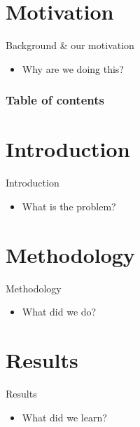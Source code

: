 \documentclass[10pt]{beamer}
\title[\presentationtitleshort]{\presentationtitle}
\author{\presentingauthor}
\institute[\instituteabbrv]{\institutename}
\date{\presentationdate}
\let\olditem\item
\renewcommand{\item}{\setlength{\itemsep}{\fill}\olditem}
\begin{document}
\frame{\titlepage}

\section{Motivation}

	\begin{frame}{Background \& our motivation}
	\begin{itemize}
		\item Why are we doing this? \cite{example}
	\end{itemize}
	\end{frame}

	\begin{frame}
		\frametitle{Table of contents}
		\tableofcontents
	\end{frame}

\section{Introduction}

	\begin{frame}{Introduction}
	\begin{itemize}
		\item What is the problem?
	\end{itemize}
	\end{frame}

\section{Methodology}

	\begin{frame}{Methodology}
	\begin{itemize}
		\item What did we do?
	\end{itemize}
	\end{frame}

\section{Results}

	\begin{frame}{Results}
	\begin{itemize}
		\item What did we learn?
	\end{itemize}
	\end{frame}
\end{document}
